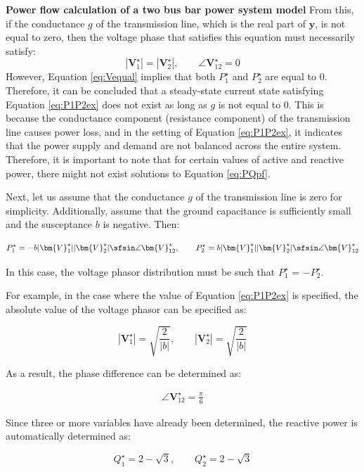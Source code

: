\documentclass[graybox, envcountchap]{svmult}
\begin{document}
\begin{example}{\textbf{Power flow calculation of a two bus bar power system
model}}
From this, if the conductance $g$ of the transmission line, which is the real
part of $\bm{y}$, is not equal to zero, then the voltage phase that satisfies
this equation must necessarily satisfy:
\begin{equation}\label{eq:Vequal}
  |\bm{V}_1^{\star}| = |\bm{V}_2^{\star}|,\qquad
  \angle \bm{V}_{12}^{\star} =0
\end{equation}
However, Equation \ref{eq:Vequal} implies that both $P_1^{\star}$ and
$P_2^{\star}$ are equal to 0. Therefore, it can be concluded that a steady-state
current state satisfying Equation \ref{eq:P1P2ex} does not exist as long as $g$
is not equal to 0. This is because the conductance component (resistance
component) of the transmission line causes power loss, and in the setting of
Equation \ref{eq:P1P2ex}, it indicates that the power supply and demand are not
balanced across the entire system. Therefore, it is important to note that for
certain values of active and reactive power, there might not exist solutions to
Equation \ref{eq:PQpf}.

Next, let us assume that the conductance $g$ of the transmission line is zero
for simplicity. Additionally, assume that the ground capacitance is sufficiently
small and the susceptance $b$ is negative. Then:

\begin{equation*}
  P_1^{\star} = -b  |\bm{V}_1^{\star}| |\bm{V}_2^{\star}| \sfsin \angle \bm{V}_{12}^{\star}, \qquad
  P_2^{\star}  =   b |\bm{V}_1^{\star}| |\bm{V}_2^{\star}| \sfsin \angle \bm{V}_{12}^{\star}
\end{equation*}

In this case, the voltage phasor distribution must be such that $P_1^{\star}$ =
$-P_2^{\star}$.

For example, in the case where the value of Equation \ref{eq:P1P2ex} is
specified, the absolute value of the voltage phasor can be specified as:

\begin{equation*}\textstyle
  |\bm{V}_1^{\star}|=\sqrt{
    \frac{2}{|b|}
  }
  ,\qquad
  |\bm{V}_2^{\star}| 
  =
  \sqrt{
    \frac{2}{|b|}
  }
\end{equation*}

As a result, the phase difference can be determined as:

\begin{align*}
\angle \bm{V}_{12}^{\star} = \frac{\pi}{6}
\end{align*}

Since three or more variables have already been determined, the reactive power
is automatically determined as:

\begin{equation*}
  Q_1^{\star} = 2 -\sqrt{3},\qquad
  Q_2^{\star} = 2 -\sqrt{3}
\end{equation*}
\end{example}
\end{document}
